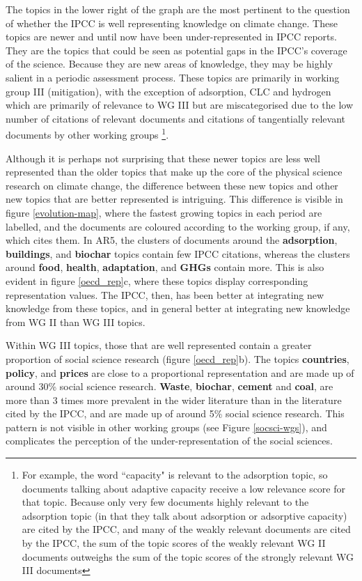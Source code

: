 \documentclass{article}
\begin{document}
\begin{linenumbers}
The topics in the lower right of the graph are the most pertinent to the question of whether the IPCC is well representing knowledge on climate change. These topics are newer and until now have been under-represented in IPCC reports. They are the topics that could be seen as potential gaps in the IPCC's coverage of the science. Because they are new areas of knowledge, they may be highly salient in a periodic assessment process. These topics are primarily in working group III (mitigation), with the exception of adsorption, CLC and hydrogen which are primarily of relevance to WG III but are miscategorised due to the low number of citations of relevant documents and citations of tangentially relevant documents by other working groups \footnote{For example, the word ``capacity" is relevant to the adsorption topic, so documents talking about adaptive capacity receive a low relevance score for that topic. Because only very few documents highly relevant to the adsorption topic (in that they talk about adsorption or adsorptive capacity) are cited by the IPCC, and many of the weakly relevant documents are cited by the IPCC, the sum of the topic scores of the weakly relevant WG II documents outweighs the sum of the topic scores of the strongly relevant WG III documents}.

Although it is perhaps not surprising that these newer topics are less well represented than the older topics that make up the core of the physical science research on climate change, the difference between these new topics and other new topics that are better represented is intriguing. This difference is visible in figure \ref{evolution-map}, where the fastest growing topics in each period are labelled, and the documents are coloured according to the working group, if any, which cites them. In AR5, the clusters of documents around the \textbf{adsorption}, \textbf{buildings}, and \textbf{biochar} topics contain few IPCC citations, whereas the clusters around \textbf{food}, \textbf{health}, \textbf{adaptation}, and \textbf{GHGs} contain more. This is also evident in figure \ref{oecd_rep}c, where these topics display corresponding representation values. The IPCC, then, has been better at integrating new knowledge from these topics, and in general better at integrating new knowledge from WG II  than WG III topics.

Within WG III topics, those that are well represented contain a greater proportion of social science research (figure \ref{oecd_rep}b). The topics \textbf{countries}, \textbf{policy}, and \textbf{prices} are close to a proportional representation and are made up of around 30\% social science research. \textbf{Waste}, \textbf{biochar}, \textbf{cement} and \textbf{coal}, are more than 3 times more prevalent in the wider literature than in the literature cited by the IPCC, and are made up of around 5\% social science research. This pattern is not visible in other working groups (see Figure \ref{socsci-wgs}), and complicates the perception of the under-representation of the social sciences.



\end{linenumbers}
\end{document}
